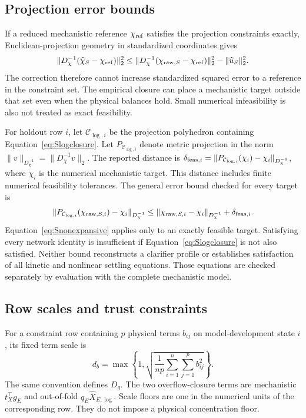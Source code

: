 \documentclass[a4paper,fleqn]{cas-sc}
\begin{document}
\subsection{Projection error bounds}
\label{sec:Serrorbounds}

If a reduced mechanistic reference $\chi_{\rm ref}$ satisfies the projection constraints exactly, Euclidean-projection geometry in standardized coordinates gives
\begin{equation}
\|D_\chi^{-1}(\widehat\chi_S-\chi_{\rm ref})\|_2^2
\le \|D_\chi^{-1}(\chi_{{\rm raw},S}-\chi_{\rm ref})\|_2^2
-\|\widehat u_S\|_2^2.
\label{eq:Snonexpansive}
\end{equation}
The correction therefore cannot increase standardized squared error to a reference in the constraint set. The empirical closure can place a mechanistic target outside that set even when the physical balances hold. Small numerical infeasibility is also not treated as exact feasibility.

For holdout row $i$, let $\mathcal C_{\log,i}$ be the projection polyhedron containing Equation~\eqref{eq:Slogclosure}. Let $P_{\mathcal C_{\log,i}}$ denote metric projection in the norm $\|v\|_{D_\chi^{-1}}=\|D_\chi^{-1}v\|_2$. The reported distance is $\delta_{{\rm feas},i}=\|P_{\mathcal C_{\log,i}}(\chi_i)-\chi_i\|_{D_\chi^{-1}}$, where $\chi_i$ is the numerical mechanistic target. This distance includes finite numerical feasibility tolerances. The general error bound checked for every target is
\begin{equation}
\|P_{\mathcal C_{\log,i}}(\chi_{{\rm raw},S,i})-\chi_i\|_{D_\chi^{-1}}
\le \|\chi_{{\rm raw},S,i}-\chi_i\|_{D_\chi^{-1}}+\delta_{{\rm feas},i}.
\label{eq:Sfinitefeasibility}
\end{equation}
Equation~\eqref{eq:Snonexpansive} applies only to an exactly feasible target. Satisfying every network identity is insufficient if Equation~\eqref{eq:Slogclosure} is not also satisfied. Neither bound reconstructs a clarifier profile or establishes satisfaction of all kinetic and nonlinear settling equations. Those equations are checked separately by evaluation with the complete mechanistic model.

\subsection{Row scales and trust constraints}
\label{sec:Strust}

For a constraint row containing $p$ physical terms $b_{ij}$ on model-development state $i$, its fixed term scale is
\begin{equation}
d_b=\max\left\{1,\sqrt{\frac{1}{np}\sum_{i=1}^{n}\sum_{j=1}^{p}b_{ij}^{2}}\right\}.
\label{eq:Srowscale}
\end{equation}
The same convention defines $D_g$. The two overflow-closure terms are mechanistic $t_X^\top g_E$ and out-of-fold $q_E\widehat X_{E,\log}$. Scale floors are one in the numerical units of the corresponding row. They do not impose a physical concentration floor.
\end{document}

